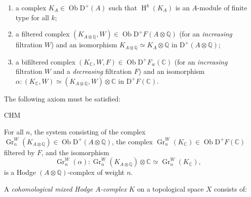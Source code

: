     
 \begin{enumerate}
      
 \item[(𝛼)]
        a complex \(K_A\in \operatorname {Ob}\mathrm {D}^+(A)\) such that \(\operatorname {H}^k(K_A)\) is an \(A\)-module of finite type for all \(k\);
      


      
 \item[(𝛽)]
        a filtered complex \((K_{A\otimes \mathbb {Q}},W)\in \operatorname {Ob}\mathrm {D}^+F(A\otimes \mathbb {Q})\) (for an \emph{increasing} filtration \(W\)) and an isomorphism \(K_{A\otimes \mathbb {Q}}\simeq  K_A\otimes \mathbb {Q}\) in \(\mathrm {D}^+(A\otimes \mathbb {Q})\);
      


      
 \item[(𝛾)]
        a bifiltered complex \((K_\mathbb {C},W,F)\in \operatorname {Ob}\mathrm {D}^+F_w(\mathbb {C})\) (for an \emph{increasing} filtration \(W\) and a \emph{decreasing} filtration \(F\)) and an isomorphism \(\alpha \colon (K_\mathbb {C},W)\simeq (K_{A\otimes \mathbb {Q}},W)\otimes \mathbb {C}\) in \(\mathrm {D}^+F(\mathbb {C})\).
      

    \end{enumerate}\par{}The following axiom must be satisfied:

    \begin{axiom}{CHM}\label{hodge-theory-iii-8.1.5-chm}\skipsinglepar\par{}For all \(n\), the system consisting of the complex \(\operatorname {Gr}_n^W(K_{A\otimes \mathbb {Q}})\in \operatorname {Ob}\mathrm {D}^+(A\otimes \mathbb {Q})\), the complex \(\operatorname {Gr}_n^W(K_\mathbb {C})\in \operatorname {Ob}\mathrm {D}^+F(\mathbb {C})\) filtered by \(F\), and the isomorphism
        \[           \operatorname {Gr}_n^W(\alpha )\colon            \operatorname {Gr}_n^W(K_{A\otimes \mathbb {Q}})\otimes \mathbb {C}           \simeq  \operatorname {Gr}_n^W(K_\mathbb {C}),         \]
        is a Hodge \((A\otimes \mathbb {Q})\)-complex of weight \(n\).\end{axiom}\label{hodge-theory-iii-8.1.6}\par{}A \emph{cohomological mixed Hodge \(A\)-complex} \(K\) on a topological space \(X\) consists of:

